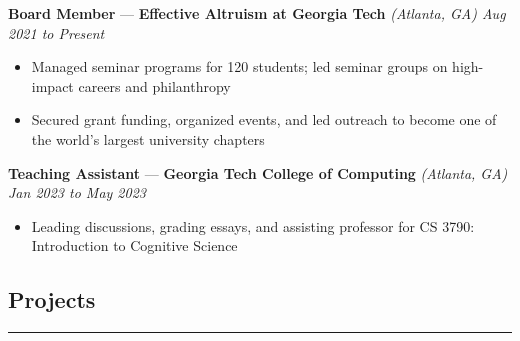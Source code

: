 \documentclass[10pt]{article}
\newcommand{\resumeHeading}[1]{
    \subsection*{#1}
    \hrule
    \vspace*{5pt}
}
\newcommand{\resumeSubHeading}[4]{
    \vspace*{5pt}
    \textbf{#1} — \textbf{#2} \textsl{(#3) \hfill #4}
}
\begin{document}
\resumeSubHeading
    {Board Member}
    {Effective Altruism at Georgia Tech}
    {Atlanta, GA}
    {Aug 2021 to Present}
\begin{itemize}
    \item Managed seminar programs for 120 students; led seminar groups on high-impact careers and philanthropy
    \item Secured grant funding, organized events, and led outreach to become one of the world's largest university chapters
\end{itemize}

\resumeSubHeading
    {Teaching Assistant}
    {Georgia Tech College of Computing}
    {Atlanta, GA}
    {Jan 2023 to May 2023}
\begin{itemize}
    \item Leading discussions, grading essays, and assisting professor for CS 3790: Introduction to Cognitive Science
\end{itemize}



\resumeHeading{Projects \vspace{-2.5pt}}



    
\end{document}
